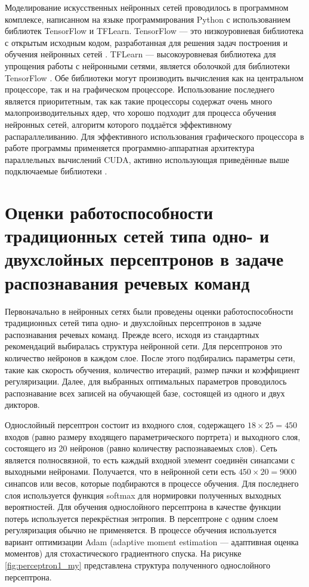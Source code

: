 Моделирование искусственных нейронных сетей проводилось в программном комплексе, написанном на языке программирования Python с использованием библиотек TensorFlow и TFLearn.
TensorFlow --- это низкоуровневая библиотека с открытым исходным кодом, разработанная для решения задач построения и обучения нейронных сетей \cite{tensorflow}.
TFLearn --- высокоуровневая библиотека для упрощения работы с нейронными сетями, является оболочкой для библиотеки TensorFlow \cite{tflearn}.
Обе библиотеки могут производить вычисления как на центральном процессоре, так и на графическом процессоре.
Использование последнего является приоритетным, так как такие процессоры содержат очень много малопроизводительных ядер, что хорошо подходит для процесса обучения нейронных сетей, алгоритм которого поддаётся эффективному распараллеливанию.
Для эффективного использования графического процессора в работе программы применяется программно-аппаратная архитектура параллельных вычислений CUDA, активно использующая приведённые выше подключаемые библиотеки \cite{cuda}.


\section{Оценки работоспособности традиционных сетей типа одно- и двухслойных персептронов в задаче распознавания речевых команд} \label{sect4_1}

Первоначально в нейронных сетях были проведены оценки работоспособности традиционных сетей типа одно- и двухслойных персептронов в задаче распознавания речевых команд.
Прежде всего, исходя из стандартных рекомендаций выбиралась структура нейронной сети.
Для персептронов это количество нейронов в каждом слое.
После этого подбирались параметры сети, такие как скорость обучения, количество итераций, размер пачки и коэффициент регуляризации.
Далее, для выбранных оптимальных параметров проводилось распознавание всех записей на обучающей базе, состоящей из одного и двух дикторов.

Однослойный персептрон состоит из входного слоя, содержащего $18 \times 25 = 450$ входов (равно размеру входящего параметрического портрета) и выходного слоя, состоящего из 20 нейронов (равно количеству распознаваемых слов).
Сеть является полносвязной, то есть каждый входной элемент соединён синапсами с выходными нейронами.
Получается, что в нейронной сети есть $450 \times 20 = 9000$ синапсов или весов, которые подбираются в процессе обучения.
Для последнего слоя используется функция softmax для нормировки полученных выходных вероятностей.
Для обучения однослойного персептрона в качестве функции потерь используется перекрёстная энтропия.
В персептроне с одним слоем регуляризация обычно не применяется.
В процессе обучения используется вариант оптимизации Adam (adaptive moment estimation --- адаптивная оценка моментов) для стохастического градиентного спуска.
На рисунке \ref{fig:perceptron1_my} представлена структура полученного однослойного персептрона.

